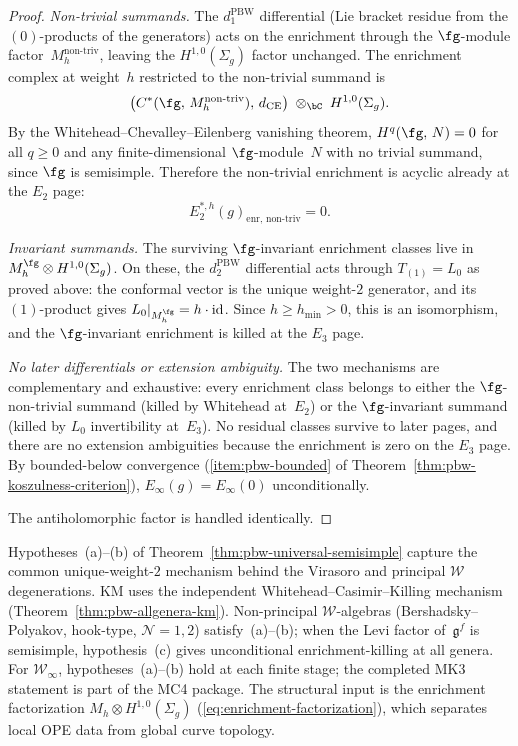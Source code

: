 \begin{proof}
\emph{Non-trivial summands.}
The $d_1^{\mathrm{PBW}}$ differential
(Lie bracket residue from the $(0)$-products of the generators)
acts on the enrichment through the $\fg$-module
factor~$M_h^{\mathrm{non\text{-}triv}}$, leaving the
$H^{1,0}(\Sigma_g)$ factor unchanged.  The enrichment complex
at weight~$h$ restricted to the non-trivial summand is
\[
\bigl(C^*(\fg,\, M_h^{\mathrm{non\text{-}triv}}),\, d_{\mathrm{CE}}\bigr)
\;\otimes_{\bC}\;
H^{1,0}(\Sigma_g).
\]
By the Whitehead--Chevalley--Eilenberg vanishing theorem,
$H^q(\fg,\, N) = 0$ for all $q \geq 0$ and any
finite-dimensional $\fg$-module~$N$ with no trivial summand,
since $\fg$ is semisimple.  Therefore the non-trivial
enrichment is acyclic already at the $E_2$ page:
\[
E_2^{*,h}(g)_{\mathrm{enr,\, non\text{-}triv}} = 0.
\]

\emph{Invariant summands.}
The surviving $\fg$-invariant enrichment classes live in
$M_h^{\fg} \otimes H^{1,0}(\Sigma_g)$.  On these, the
$d_2^{\mathrm{PBW}}$ differential acts through $T_{(1)} = L_0$
as proved above: the conformal vector is the unique weight-$2$
generator, and its $(1)$-product gives
$L_0|_{M_h^{\fg}} = h \cdot \mathrm{id}$.  Since
$h \geq h_{\min} > 0$, this is an isomorphism, and the
$\fg$-invariant enrichment is killed at the $E_3$ page.

\emph{No later differentials or extension ambiguity.}
The two mechanisms are complementary and exhaustive:
every enrichment class belongs to either the
$\fg$-non-trivial summand (killed by Whitehead at~$E_2$)
or the $\fg$-invariant summand (killed by $L_0$ invertibility
at~$E_3$).  No residual classes survive to later pages,
and there are no extension ambiguities because the enrichment
is zero on the $E_3$ page.  By bounded-below convergence
\textup{(}\ref{item:pbw-bounded} of
Theorem~\ref{thm:pbw-koszulness-criterion}\textup{)},
$E_\infty(g) = E_\infty(0)$ unconditionally.

The antiholomorphic factor is handled identically.
\end{proof}

\begin{remark}
\label{rem:pbw-universal-scope}
Hypotheses~(a)--(b) of Theorem~\ref{thm:pbw-universal-semisimple}
capture the common unique-weight-$2$ mechanism behind the Virasoro
and principal $\mathcal{W}$ degenerations.
KM uses the independent Whitehead--Casimir--Killing mechanism
(Theorem~\ref{thm:pbw-allgenera-km}).
Non-principal $\mathcal{W}$-algebras (Bershadsky--Polyakov,
hook-type, $\mathcal{N}=1,2$) satisfy~(a)--(b); when the Levi
factor of~$\mathfrak{g}^f$ is semisimple, hypothesis~(c) gives
unconditional enrichment-killing at all genera.
For $\mathcal{W}_\infty$, hypotheses~(a)--(b) hold at each finite
stage; the completed MK3 statement is part of the MC4 package.
The structural input is the enrichment factorization
$M_h \otimes H^{1,0}(\Sigma_g)$
(\ref{eq:enrichment-factorization}), which separates local OPE
data from global curve topology.
\end{remark}

